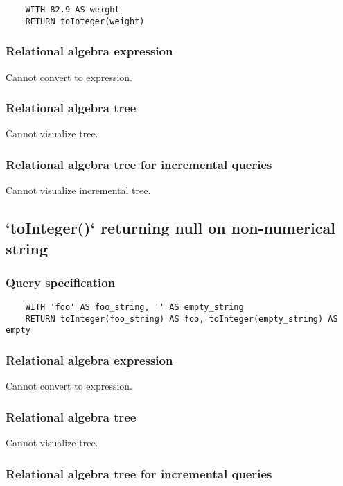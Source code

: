 	\begin{lstlisting}
	WITH 82.9 AS weight
	RETURN toInteger(weight)
	\end{lstlisting}


	\subsubsection*{Relational algebra expression}

	Cannot convert to expression.

	\subsubsection*{Relational algebra tree}

	Cannot visualize tree.

	\subsubsection*{Relational algebra tree for incremental queries}

	Cannot visualize incremental tree.
	\subsection{`toInteger()` returning null on non-numerical string}

	\subsubsection*{Query specification}

	\begin{lstlisting}
	WITH 'foo' AS foo_string, '' AS empty_string
	RETURN toInteger(foo_string) AS foo, toInteger(empty_string) AS empty
	\end{lstlisting}


	\subsubsection*{Relational algebra expression}

	Cannot convert to expression.

	\subsubsection*{Relational algebra tree}

	Cannot visualize tree.

	\subsubsection*{Relational algebra tree for incremental queries}

